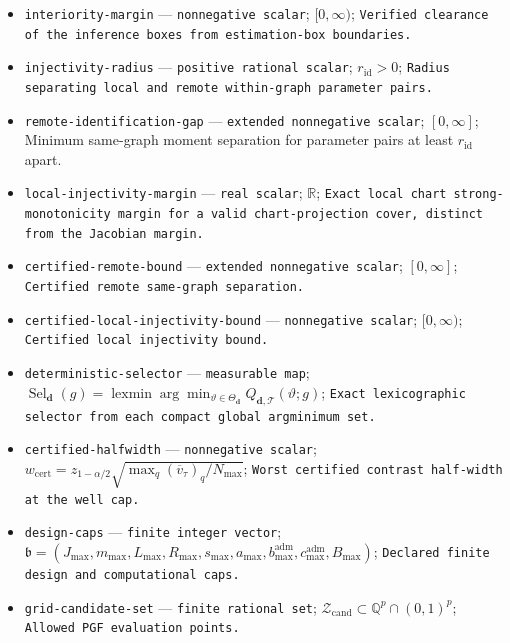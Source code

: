 \documentclass{article}
\begin{document}
\begin{itemize}
  \item \texttt{interiority-\allowbreak{}margin} --- \texttt{nonnegative scalar}; \([0,\infty)\); \texttt{Verified clearance of the inference boxes from estimation-\allowbreak{}box boundaries.}
  \item \texttt{injectivity-\allowbreak{}radius} --- \texttt{positive rational scalar}; \(r_{\mathrm{id}}>0\); \texttt{Radius separating local and remote within-\allowbreak{}graph parameter pairs.}
  \item \texttt{remote-\allowbreak{}identification-\allowbreak{}gap} --- \texttt{extended nonnegative scalar}; \([0,\infty]\); Minimum same-graph moment separation for parameter pairs at least \(r_{\mathrm{id}}\) apart.
  \item \texttt{local-\allowbreak{}injectivity-\allowbreak{}margin} --- \texttt{real scalar}; \(\mathbb R\); \texttt{Exact local chart strong-\allowbreak{}monotonicity margin for a valid chart-\allowbreak{}projection cover,\allowbreak{} distinct from the Jacobian margin.}
  \item \texttt{certified-\allowbreak{}remote-\allowbreak{}bound} --- \texttt{extended nonnegative scalar}; \([0,\infty]\); \texttt{Certified remote same-\allowbreak{}graph separation.}
  \item \texttt{certified-\allowbreak{}local-\allowbreak{}injectivity-\allowbreak{}bound} --- \texttt{nonnegative scalar}; \([0,\infty)\); \texttt{Certified local injectivity bound.}
  \item \texttt{deterministic-\allowbreak{}selector} --- \texttt{measurable map}; \(\operatorname{Sel}_{\boldsymbol d}(g)=\operatorname{lexmin}\arg\min_{\vartheta\in\Theta_{\boldsymbol d}}Q_{\boldsymbol d,\mathcal T}(\vartheta;g)\); \texttt{Exact lexicographic selector from each compact global argminimum set.}
  \item \texttt{certified-\allowbreak{}halfwidth} --- \texttt{nonnegative scalar}; \(w_{\mathrm{cert}}=z_{1-\alpha/2}\sqrt{\max_q(\overline v_\tau)_q/N_{\max}}\); \texttt{Worst certified contrast half-\allowbreak{}width at the well cap.}
  \item \texttt{design-\allowbreak{}caps} --- \texttt{finite integer vector}; \(\mathfrak b=(J_{\max},m_{\max},L_{\max},R_{\max},s_{\max},a_{\max},b_{\max}^{\mathrm{adm}},c_{\max}^{\mathrm{adm}},B_{\max})\); \texttt{Declared finite design and computational caps.}
  \item \texttt{grid-\allowbreak{}candidate-\allowbreak{}set} --- \texttt{finite rational set}; \(\mathcal Z_{\mathrm{cand}}\subset\mathbb Q^p\cap(0,1)^p\); \texttt{Allowed PGF evaluation points.}

\end{itemize}
\end{document}
